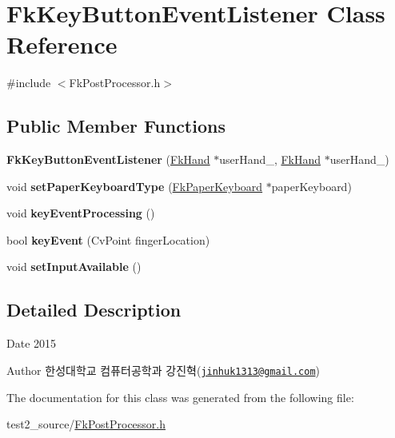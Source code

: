 \hypertarget{class_fk_key_button_event_listener}{}\section{Fk\+Key\+Button\+Event\+Listener Class Reference}
\label{class_fk_key_button_event_listener}


{\ttfamily \#include $<$Fk\+Post\+Processor.\+h$>$}

\subsection*{Public Member Functions}
\begin{DoxyCompactItemize}
\item 
\hypertarget{class_fk_key_button_event_listener_aa9b1cf77bd1e8aea6265697ea568ce77}{}{\bfseries Fk\+Key\+Button\+Event\+Listener} (\hyperlink{class_fk_hand}{Fk\+Hand} $\ast$user\+Hand\+\_, \hyperlink{class_fk_hand}{Fk\+Hand} $\ast$user\+Hand\+\_)\label{class_fk_key_button_event_listener_aa9b1cf77bd1e8aea6265697ea568ce77}

\item 
\hypertarget{class_fk_key_button_event_listener_ae4798aa9c625c195afd0089ceaea8eb0}{}void {\bfseries set\+Paper\+Keyboard\+Type} (\hyperlink{class_fk_paper_keyboard}{Fk\+Paper\+Keyboard} $\ast$paper\+Keyboard)\label{class_fk_key_button_event_listener_ae4798aa9c625c195afd0089ceaea8eb0}

\item 
\hypertarget{class_fk_key_button_event_listener_ae164ca88ff6e135621c16777e64f16ac}{}void {\bfseries key\+Event\+Processing} ()\label{class_fk_key_button_event_listener_ae164ca88ff6e135621c16777e64f16ac}

\item 
\hypertarget{class_fk_key_button_event_listener_a674964385a8fdbb55ae6b73628c07d7a}{}bool {\bfseries key\+Event} (Cv\+Point finger\+Location)\label{class_fk_key_button_event_listener_a674964385a8fdbb55ae6b73628c07d7a}

\item 
\hypertarget{class_fk_key_button_event_listener_a0998cc7cea83a4f1f69b664916be88b9}{}void {\bfseries set\+Input\+Available} ()\label{class_fk_key_button_event_listener_a0998cc7cea83a4f1f69b664916be88b9}

\end{DoxyCompactItemize}


\subsection{Detailed Description}
\begin{DoxyDate}{Date}
2015 
\end{DoxyDate}
\begin{DoxyAuthor}{Author}
한성대학교 컴퓨터공학과 강진혁(\href{mailto:jinhuk1313@gmail.com}{\tt jinhuk1313@gmail.\+com}) 
\end{DoxyAuthor}


The documentation for this class was generated from the following file\+:\begin{DoxyCompactItemize}
\item 
test2\+\_\+source/\hyperlink{_fk_post_processor_8h}{Fk\+Post\+Processor.\+h}\end{DoxyCompactItemize}
